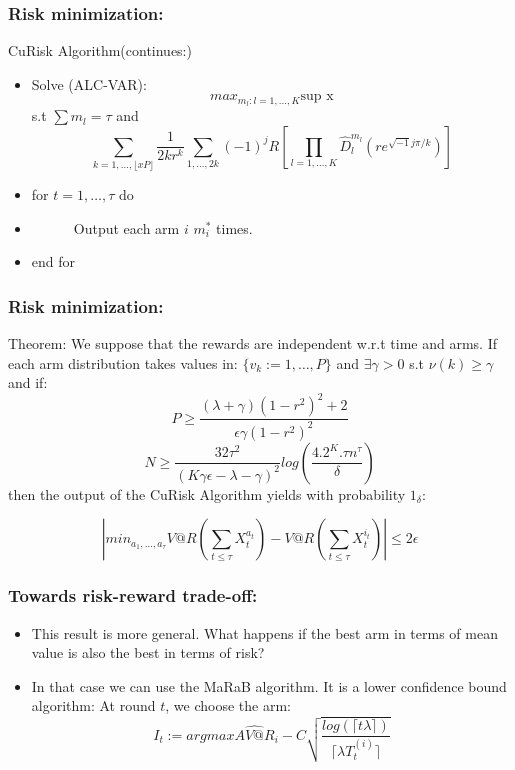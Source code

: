 \documentclass[english]{beamer}
\begin{document}
\begin{frame}
\frametitle{Risk minimization:}

\begin{block}{CuRisk Algorithm(continues:)}

\begin{itemize}
\item[6: \ ] Solve (ALC-VAR):$$max_{m_l:l=1,\dots,K}\text{sup \ x} $$ s.t $\sum m_l=\tau$ and
$$\sum_{k=1,\dots,\lfloor xP \rfloor} \frac{1}{2kr^k}\sum_{1,\dots,2k} (-1)^j R[\prod_{l=1,\dots,K}\hat{D}_l^{m_l}(re^{\sqrt{-1}j \pi/k})]$$
\item[7: \ ] for $t=1,\dots,\tau$ do 
\item[8: \ ] \ \ \ \ \ \ Output each arm $i$ $m^*_i$ times.
\item[9: \ ] end for
\end{itemize}

\end{block}
\end{frame}

\begin{frame}
\frametitle{Risk minimization:}
\begin{block}{Theorem:}
We suppose that the rewards are independent w.r.t time and arms. If each arm distribution takes values in: $\{v_k:=1,\dots,P\}$ and $\exists \gamma>0$ s.t $\nu(k)\geq\gamma$ and if:
$$P\geq \frac{(\lambda+\gamma)(1-r^2)^2+2}{\epsilon\gamma(1-r^2)^2}$$
$$N\geq \frac{32\tau^2}{(K\gamma\epsilon-\lambda-\gamma)^2}log(\frac{4.2^K.\tau n^{\tau}}{\delta})$$
then the output of the CuRisk Algorithm yields with probability $1_\delta$:

$$|min_{a_1,\dots,a_{\tau}} V@R(\sum_{t\leq \tau}X^{a_t}_t)-V@R(\sum_{t\leq \tau}X^{i_t}_t)|\leq 2 \epsilon$$

\end{block}

\end{frame}

\begin{frame}
\frametitle{Towards risk-reward trade-off:}
\begin{itemize}
\item This result is more general. What happens if the best arm in terms of mean value is also the best in terms of risk?
\item In that case we can use the MaRaB algorithm. It is a lower confidence bound algorithm: At round $t$, we choose the arm:$$I_t:=argmax{\widehat{AV@R}_i-C\sqrt{\frac{log(\lceil t \lambda \rceil)}{\lceil \lambda T_t^{(i)} \rceil}}}$$


\end{itemize}
\end{frame}
\end{document}
